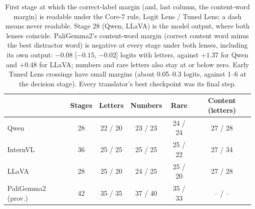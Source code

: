 \documentclass[11pt]{article}
\begin{document}
\begin{table}[H]
\centering
\scriptsize
\setlength{\tabcolsep}{3pt}
\begin{tabular}{@{}lccccc@{}}
\toprule
 & Stages & Letters & Numbers & Rare & Content (letters) \\
\midrule
Qwen & 28 & 22 / 20 & 23 / 23 & 24 / 24 & 27 / 28 \\
InternVL & 36 & 25 / 25 & 25 / 25 & 25 / 22 & 27 / 34 \\
LLaVA & 28 & 25 / 20 & 24 / 25 & 25 / 20 & 27 / 28 \\
PaliGemma2 (prov.) & 42 & 35 / 35 & 37 / 40 & 35 / 33 & -- / -- \\
\bottomrule
\end{tabular}
\caption{First stage at which the correct-label margin (and, last column, the content-word margin) is readable under the Core-7 rule, Logit Lens / Tuned Lens; a dash means never readable. Stage 28 (Qwen, LLaVA) is the model output, where both lenses coincide. PaliGemma2's content-word margin (correct content word minus the best distractor word) is negative at every stage under both lenses, including its own output: $-0.08$ [$-0.15$, $-0.02$] logits with letters, against $+1.37$ for Qwen and $+0.48$ for LLaVA; numbers and rare letters also stay at or below zero. Early Tuned Lens crossings have small margins (about 0.05--0.3 logits, against 1--6 at the decision stage). Every translator's best checkpoint was its final step.}
\end{table}
\end{document}
